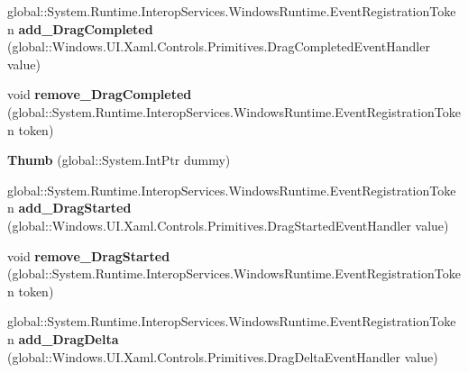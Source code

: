 \begin{DoxyCompactItemize}
\item 
\mbox{\label{class_windows_1_1_u_i_1_1_xaml_1_1_controls_1_1_primitives_1_1_thumb_a78452356d0361197920635b5002bf90f}} 
global\+::\+System.\+Runtime.\+Interop\+Services.\+Windows\+Runtime.\+Event\+Registration\+Token {\bfseries add\+\_\+\+Drag\+Completed} (global\+::\+Windows.\+U\+I.\+Xaml.\+Controls.\+Primitives.\+Drag\+Completed\+Event\+Handler value)
\item 
\mbox{\label{class_windows_1_1_u_i_1_1_xaml_1_1_controls_1_1_primitives_1_1_thumb_a097aeafd8ad0e07599e35793e0ef16ca}} 
void {\bfseries remove\+\_\+\+Drag\+Completed} (global\+::\+System.\+Runtime.\+Interop\+Services.\+Windows\+Runtime.\+Event\+Registration\+Token token)
\item 
\mbox{\label{class_windows_1_1_u_i_1_1_xaml_1_1_controls_1_1_primitives_1_1_thumb_acd7bc9b9e039aaac5e1b684e7f15f078}} 
{\bfseries Thumb} (global\+::\+System.\+Int\+Ptr dummy)
\item 
\mbox{\label{class_windows_1_1_u_i_1_1_xaml_1_1_controls_1_1_primitives_1_1_thumb_ab1e477ea93baeef13137c92d8314a13a}} 
global\+::\+System.\+Runtime.\+Interop\+Services.\+Windows\+Runtime.\+Event\+Registration\+Token {\bfseries add\+\_\+\+Drag\+Started} (global\+::\+Windows.\+U\+I.\+Xaml.\+Controls.\+Primitives.\+Drag\+Started\+Event\+Handler value)
\item 
\mbox{\label{class_windows_1_1_u_i_1_1_xaml_1_1_controls_1_1_primitives_1_1_thumb_a44985b0beddf8dcf180137b37763091e}} 
void {\bfseries remove\+\_\+\+Drag\+Started} (global\+::\+System.\+Runtime.\+Interop\+Services.\+Windows\+Runtime.\+Event\+Registration\+Token token)
\item 
\mbox{\label{class_windows_1_1_u_i_1_1_xaml_1_1_controls_1_1_primitives_1_1_thumb_ab21b89a45b43ce6913868468c69ad277}} 
global\+::\+System.\+Runtime.\+Interop\+Services.\+Windows\+Runtime.\+Event\+Registration\+Token {\bfseries add\+\_\+\+Drag\+Delta} (global\+::\+Windows.\+U\+I.\+Xaml.\+Controls.\+Primitives.\+Drag\+Delta\+Event\+Handler value)

\end{DoxyCompactItemize}
